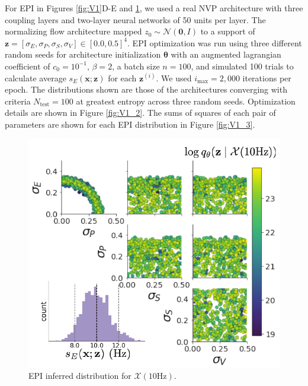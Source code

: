 \documentclass[11pt]{article}
\begin{document}
For EPI in Figures \ref{fig:V1}D-E and \ref{fig:V1_1}, we used a real NVP architecture with three coupling layers and two-layer neural networks of 50 units per layer.
The normalizing flow architecture mapped $z_0 \sim \mathcal{N}(\mathbf{0}, I)$ to a support of $\mathbf{z} = [\sigma_E, \sigma_P, \sigma_S, \sigma_V] \in [0.0, 0.5]^4$.
EPI optimization was run using three different random seeds for architecture initialization $\bm{\theta}$ with an augmented lagrangian coefficient of $c_0 = 10^{-1}$, $\beta = 2$, a batch size $n=100$, and simulated 100 trials to calculate average $s_E(\mathbf{x}; \mathbf{z})$ for each $\mathbf{z}^{(i)}$.
We used $i_{\text{max}} = 2,000$ iterations per epoch.
The distributions shown are those of the architectures converging with criteria $N_{\text{test}} = 100$ at greatest entropy across three random seeds.
Optimization details are shown in Figure \ref{fig:V1_2}.
The sums of squares of each pair of parameters are shown for each EPI distribution in Figure \ref{fig:V1_3}.

\begin{figure}[h]
\caption{EPI inferred distribution for $\mathcal{X}(10\text{Hz})$.
 }
 \label{fig:V1_1}
\begin{center}
\includegraphics[scale=.8]{figures/figV1_3/figV1_3.pdf}
\end{center}
\end{figure}
\end{document}
